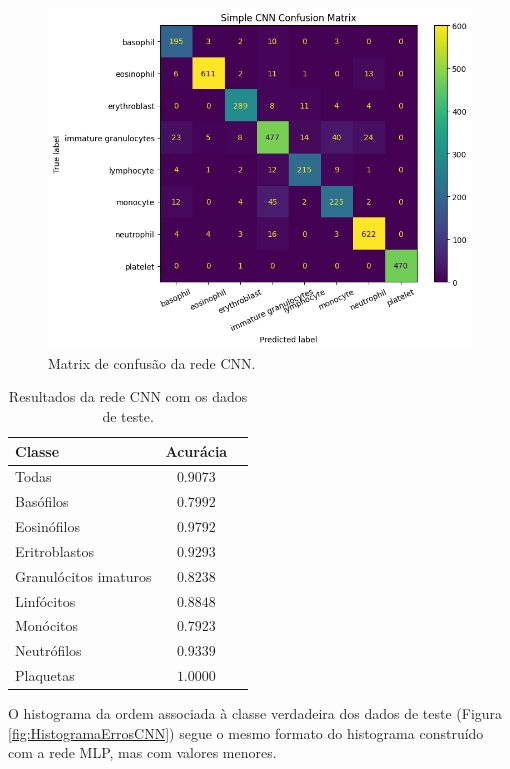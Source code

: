 \documentclass[final,5p]{elsarticle}
\numberwithin{equation}{section}
\begin{document}
    \begin{figure}[hbt!]
        \includegraphics[width=0.95\columnwidth]{CNN_Simple_cm.png}
        \caption{Matrix de confusão da rede CNN.}\label{fig:MatrizConfusaoCNN}
    \end{figure}

    \begin{table}[h]
        \centering
        \begin{tabular}{l c c}
            \toprule
            \textbf{Classe} & \textbf{Acurácia} \\
            \midrule
            Todas & $0.9073$ \\
            \addlinespace
            Basófilos  & $0.7992$ \\
            Eosinófilos  & $0.9792$ \\
            Eritroblastos  & $0.9293$ \\
            Granulócitos imaturos  & $0.8238$ \\
            Linfócitos  & $0.8848$ \\
            Monócitos  & $0.7923$ \\
            Neutrófilos  & $0.9339$ \\
            Plaquetas  & $1.0000$ \\
            \bottomrule
        \end{tabular}
        \caption{Resultados da rede CNN com os dados de teste.}\label{tab:ResultadosCNN}
    \end{table}

    O histograma da ordem associada à classe verdadeira dos dados de teste (Figura \ref{fig:HistogramaErrosCNN}) segue o mesmo formato do histograma construído com a rede MLP, mas com valores menores.
\end{document}

